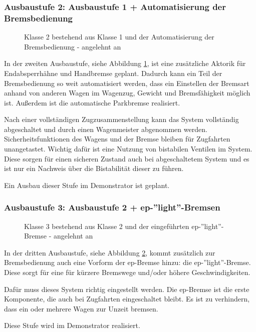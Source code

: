 \subsubsection{Ausbaustufe 2: Ausbaustufe 1 + Automatisierung der Bremsbedienung}
\begin{figure}[htbp] 
    
    \caption{Klasse 2 bestehend aus Klasse 1 und der Automatisierung der Bremsbedienung - angelehnt an \cite{ETR_3}}
    \label{fig:Klasse2}
\end{figure} 
In der zweiten Ausbaustufe, siehe Abbildung \ref{fig:Klasse2}, ist eine zusätzliche Aktorik für Endabsperrhähne und Handbremse geplant. Dadurch kann ein Teil der Bremsbedienung so weit automatisiert werden, dass ein Einstellen der Bremsart anhand von anderen Wagen im \gls{Wagenzug}, Gewicht und Bremsfähigkeit möglich ist. Außerdem ist die automatische Parkbremse realisiert.\par
Nach einer vollständigen Zugzusammenstellung kann das System vollständig abgeschaltet und durch einen Wagenmeister abgenommen werden. Sicherheitsfunktionen des Wagens und der Bremse bleiben für Zugfahrten unangetastet. Wichtig dafür ist eine Nutzung von bistabilen Ventilen im System. Diese sorgen für einen sicheren Zustand auch bei abgeschaltetem System und es ist nur ein Nachweis über die Bistabilität dieser zu führen.\par
Ein Ausbau dieser Stufe im Demonstrator ist geplant.

\subsubsection{Ausbaustufe 3: Ausbaustufe 2 + ep-''light''-Bremsen}
\begin{figure}[htbp] 
    
    \caption{Klasse 3 bestehend aus Klasse 2 und der eingeführten ep-''light''-Bremse - angelehnt an \cite{ETR_3}}
    \label{fig:Klasse3}
\end{figure} 
In der dritten Ausbaustufe, siehe Abbildung \ref{fig:Klasse3}, kommt zusätzlich zur Bremsbedienung auch eine Vorform der \gls{ep-Bremse} hinzu: die ep-''light''-Bremse. Diese sorgt für eine für kürzere Bremswege und/oder höhere Geschwindigkeiten.\par
Dafür muss dieses System richtig eingestellt werden. Die ep-Bremse ist die erste Komponente, die auch bei Zugfahrten eingeschaltet bleibt. Es ist zu verhindern, dass ein oder mehrere Wagen zur Unzeit bremsen.\par
Diese Stufe wird im Demonstrator realisiert.

